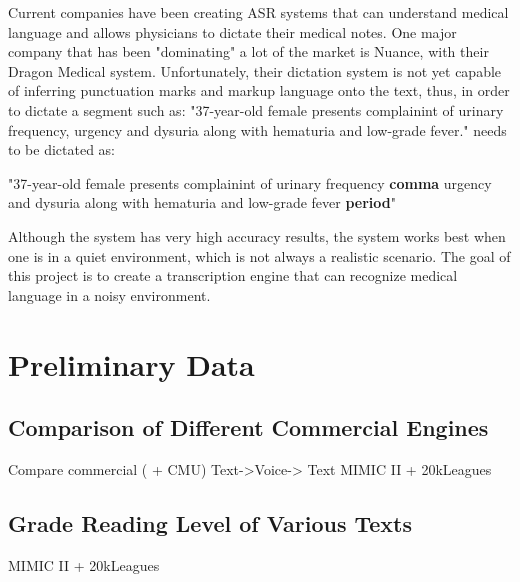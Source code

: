 Current companies have been creating ASR systems that can understand medical language and allows physicians to dictate their medical notes. One major company that has been "dominating" a lot of the market is Nuance, with their Dragon Medical system. Unfortunately, their dictation system is not yet capable of inferring punctuation marks and markup language onto the text, thus, in order to dictate a segment such as: "37-year-old female presents complainint of urinary frequency, urgency and dysuria along with hematuria and low-grade fever." needs to be dictated as:

\begin{center}
    "37-year-old female presents complainint of urinary frequency \textbf{comma} urgency and dysuria along with hematuria and low-grade fever \textbf{period}"
\end{center}

Although the system has very high accuracy results, the system works best when one is in a quiet environment, which is not always a realistic scenario. The goal of this project is to create a transcription engine that can recognize medical language in a noisy environment.

\section{Preliminary Data}

\subsection{Comparison of Different Commercial Engines}

Compare commercial ( + CMU)
Text->Voice-> Text
MIMIC II + 20kLeagues


\subsection{Grade Reading Level of Various Texts}
MIMIC II + 20kLeagues

